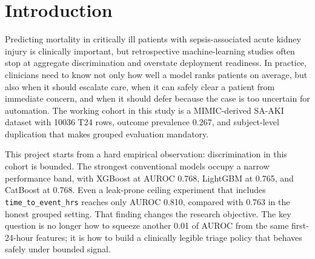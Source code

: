 \documentclass[unnumsec,webpdf,contemporary,large,numbered,nocrop]{oup-authoring-template}
\begin{document}


\maketitle

\section{Introduction}
Predicting mortality in critically ill patients with sepsis-associated acute kidney injury is clinically important, but retrospective machine-learning studies often stop at aggregate discrimination and overstate deployment readiness. In practice, clinicians need to know not only how well a model ranks patients on average, but also when it should escalate care, when it can safely clear a patient from immediate concern, and when it should defer because the case is too uncertain for automation. The working cohort in this study is a MIMIC-derived SA-AKI dataset with 10036 T24 rows, outcome prevalence 0.267, and subject-level duplication that makes grouped evaluation mandatory.\cite{johnson2016mimic}

This project starts from a hard empirical observation: discrimination in this cohort is bounded. The strongest conventional models occupy a narrow performance band, with XGBoost at AUROC 0.768, LightGBM at 0.765, and CatBoost at 0.768. Even a leak-prone ceiling experiment that includes \texttt{time\_to\_event\_hrs} reaches only AUROC 0.810, compared with 0.763 in the honest grouped setting. That finding changes the research objective. The key question is no longer how to squeeze another 0.01 of AUROC from the same first-24-hour features; it is how to build a clinically legible triage policy that behaves safely under bounded signal.
\end{document}
